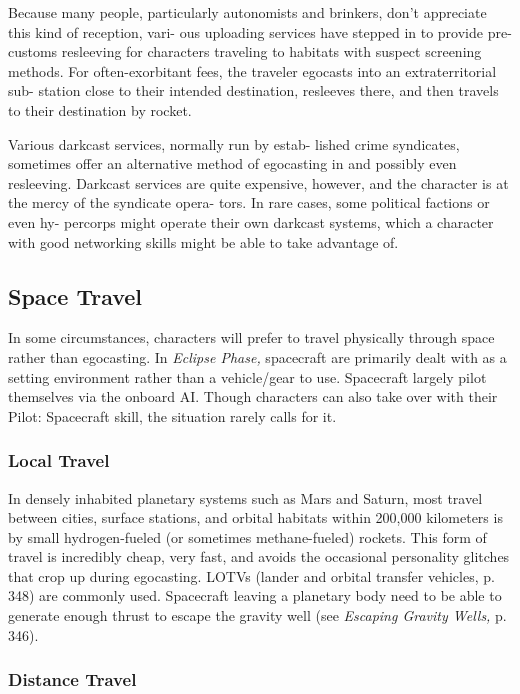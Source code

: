 Because many people, particularly autonomists and 
brinkers, don't appreciate this kind of reception, vari-
ous uploading services have stepped in to provide pre-
customs resleeving for characters traveling to habitats 
with suspect screening methods. For often-exorbitant 
fees, the traveler egocasts into an extraterritorial sub-
station close to their intended destination, resleeves 
there, and then travels to their destination by rocket.

Various darkcast services, normally run by estab-
lished crime syndicates, sometimes offer an alternative 
method of egocasting in and possibly even resleeving. 
Darkcast services are quite expensive, however, and 
the character is at the mercy of the syndicate opera-
tors. In rare cases, some political factions or even hy-
percorps might operate their own darkcast systems, 
which a character with good networking skills might 
be able to take advantage of.

\subsection{Space Travel}

In some circumstances, characters will prefer to travel 
physically through space rather than egocasting. In 
\textit{Eclipse Phase,} spacecraft are primarily dealt with as a 
setting environment rather than a vehicle/gear to use. 
Spacecraft largely pilot themselves via the onboard AI. 
Though characters can also take over with their Pilot: 
Spacecraft skill, the situation rarely calls for it.

\subsubsection{Local Travel}

In densely inhabited planetary systems such as Mars 
and Saturn, most travel between cities, surface stations, 
and orbital habitats within 200,000 kilometers is by 
small hydrogen-fueled (or sometimes methane-fueled) 
rockets. This form of travel is incredibly cheap, very 
fast, and avoids the occasional personality glitches 
that crop up during egocasting. LOTVs (lander and 
orbital transfer vehicles, p. 348) are commonly used. 
Spacecraft leaving a planetary body need to be able to 
generate enough thrust to escape the gravity well (see 
\textit{Escaping Gravity Wells,} p. 346).

\subsubsection{Distance Travel}

